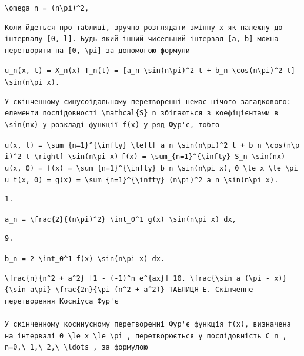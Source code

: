 \documentclass[
  ukrainian,
]{article}
\begin{document}
\texttt{\textbackslash{}omega\_n\ =\ (n\textbackslash{}pi)\^{}2,}

\begin{verbatim}
Коли йдеться про таблиці, зручно розглядати змінну x як належну до інтервалу [0, l]. Будь-який інший чисельний інтервал [a, b] можна перетворити на [0, \pi] за допомогою формули
\end{verbatim}

\texttt{u\_n(x,\ t)\ =\ X\_n(x)\ T\_n(t)\ =\ {[}a\_n\ \textbackslash{}sin(n\textbackslash{}pi)\^{}2\ t\ +\ b\_n\ \textbackslash{}cos(n\textbackslash{}pi)\^{}2\ t{]}\ \textbackslash{}sin(n\textbackslash{}pi\ x).}

\begin{verbatim}
У скінченному синусоїдальному перетворенні немає нічого загадкового: елементи послідовності \mathcal{S}_n збігаються з коефіцієнтами в \sin(nx) у розкладі функції f(x) у ряд Фур'є, тобто
\end{verbatim}

\texttt{u(x,\ t)\ =\ \textbackslash{}sum\_\{n=1\}\^{}\{\textbackslash{}infty\}\ \textbackslash{}left{[}\ a\_n\ \textbackslash{}sin(n\textbackslash{}pi)\^{}2\ t\ +\ b\_n\ \textbackslash{}cos(n\textbackslash{}pi)\^{}2\ t\ \textbackslash{}right{]}\ \textbackslash{}sin(n\textbackslash{}pi\ x)}
\texttt{f(x)\ =\ \textbackslash{}sum\_\{n=1\}\^{}\{\textbackslash{}infty\}\ S\_n\ \textbackslash{}sin(nx)}
\texttt{u(x,\ 0)\ =\ f(x)\ =\ \textbackslash{}sum\_\{n=1\}\^{}\{\textbackslash{}infty\}\ b\_n\ \textbackslash{}sin(n\textbackslash{}pi\ x),}
\texttt{0\ \textbackslash{}le\ x\ \textbackslash{}le\ \textbackslash{}pi}
\texttt{u\_t(x,\ 0)\ =\ g(x)\ =\ \textbackslash{}sum\_\{n=1\}\^{}\{\textbackslash{}infty\}\ (n\textbackslash{}pi)\^{}2\ a\_n\ \textbackslash{}sin(n\textbackslash{}pi\ x).}

\begin{verbatim}
1.
\end{verbatim}

\texttt{a\_n\ =\ \textbackslash{}frac\{2\}\{(n\textbackslash{}pi)\^{}2\}\ \textbackslash{}int\_0\^{}1\ g(x)\ \textbackslash{}sin(n\textbackslash{}pi\ x)\ dx,}

\begin{verbatim}
9.
\end{verbatim}

\texttt{b\_n\ =\ 2\ \textbackslash{}int\_0\^{}1\ f(x)\ \textbackslash{}sin(n\textbackslash{}pi\ x)\ dx.}

\begin{verbatim}
\frac{n}{n^2 + a^2} [1 - (-1)^n e^{ax}] 10. \frac{\sin a (\pi - x)}{\sin a\pi} \frac{2n}{\pi (n^2 + a^2)} ТАБЛИЦЯ E. Скінченне перетворення Косніуса Фур'є

У скінченному косинусному перетворенні Фур'є функція f(x), визначена на інтервалі 0 \le x \le \pi , перетворюється у послідовність C_n , n=0,\ 1,\ 2,\ \ldots , за формулою
\end{verbatim}
\end{document}
